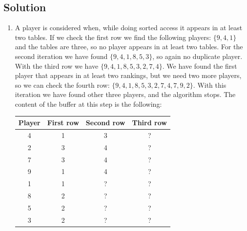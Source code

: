 \documentclass[12pt, a4paper]{report}
\newtheorem[style=M,bodystyle=\normalfont]{theorem}{Theorem}
\newtheorem[style=M,bodystyle=\normalfont]{corollary}{Corollary}
\newtheorem[style=M,bodystyle=\normalfont]{lemma}{Lemma}
\newtheorem[style=M,bodystyle=\normalfont]{definition}{Definition}
\begin{document}
    \subsection*{Solution}
    \begin{enumerate}
        \item A player is considered when, while doing sorted access it appears in at least two tables. If we check the first row we find the following players: 
            $\{9,4,1\}$ and the tables are three, so no player appears in at least two tables. For the second iteration we have found $\{9,4,1,8,5,3\}$, so again
            no duplicate player. With the third row we have $\{9,4,1,8,5,3,2,7,4\}$. We have found the first player that appears in at least two rankings, but we 
            need two more players, so we can check the fourth row: $\{9,4,1,8,5,3,2,7,4,7,9,2\}$. With this iteration we have found other three players, and 
            the algorithm stops. The content of the buffer at this step is the following: 
            \begin{table}[H]
                \centering
                \begin{tabular}{|c|ccc|}
                \hline
                \textbf{Player} & \textbf{First row} & \textbf{Second row} & \textbf{Third row} \\ \hline
                4               & 1                  & 3                   & ?                  \\
                2               & 3                  & 4                   & ?                  \\
                7               & 3                  & 4                   & ?                  \\ 
                9               & 1                  & 4                   & ?                  \\
                1               & 1                  & ?                   & ?                  \\
                8               & 2                  & ?                   & ?                  \\
                5               & 2                  & ?                   & ?                  \\
                3               & 2                  & ?                   & ?                  \\ \hline
                \end{tabular}
            \end{table}

\end{enumerate}
\end{document}

